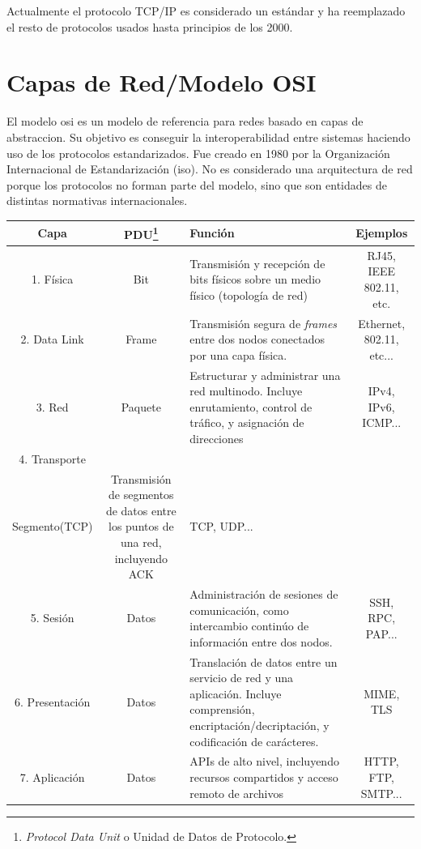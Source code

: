 \documentclass[a4paper, 11pt]{report} %
\begin{document}
Actualmente el protocolo TCP/IP es considerado un estándar y ha reemplazado el resto de protocolos usados hasta principios de los 2000.

\newpage

\section{Capas de Red/Modelo OSI}
El modelo \acrshort{osi} es un modelo de referencia para redes basado en \gls{capas de abstraccion}.
Su objetivo es conseguir la interoperabilidad entre sistemas haciendo uso de los protocolos estandarizados. Fue creado en 1980 por la Organización Internacional de Estandarización (\acrshort{iso}). No es considerado una arquitectura de red porque los protocolos no forman parte del modelo, sino que son entidades de distintas normativas internacionales.
\vspace*{20pt}

\renewcommand{\arraystretch}{1} %
\noindent\linespread{1}
\begin{tabularx}{\linewidth}{ | c >{\small}c >{\small}X >{\small}c | }
	\rowcolor{header} \hline
	\textbf{Capa} & \textbf{PDU\footnote{\textit{Protocol Data Unit} o Unidad de Datos de Protocolo.}} & \textbf{Función} & \textbf{Ejemplos} \\ \hline
	1. Física & Bit & Transmisión y recepción de bits físicos sobre un medio físico (topología de red) & 	 RJ45, IEEE 802.11, etc. \\
	\label{osi}
	2. Data Link & Frame & Transmisión segura de \textit{frames} entre dos nodos conectados por una capa física. & Ethernet, 802.11, etc...\\
	3. Red & Paquete & Estructurar y administrar una red multinodo. Incluye enrutamiento, control de tráfico, y asignación de direcciones & IPv4, IPv6, ICMP... \\
	4. Transporte & \begin{tabular}[t]{@{}c@{}}Datagrama(UDP)\\Segmento(TCP)  \end{tabular} &
	Transmisión de segmentos de datos entre los puntos de una red, incluyendo ACK & TCP, UDP...\\
	5. Sesión & Datos & Administración de sesiones de comunicación, como intercambio continúo de información entre dos nodos. & SSH, RPC, PAP...\\ 
	6. Presentación & Datos & Translación de datos entre un servicio de red y una aplicación. Incluye comprensión, encriptación/decriptación, y codificación de carácteres. & MIME, TLS \\
	7. Aplicación & Datos & APIs de alto nivel, incluyendo recursos compartidos y acceso remoto de archivos & HTTP, FTP, SMTP... \\ \hline
\end{tabularx}
\end{document}
